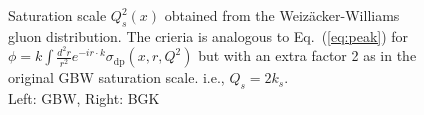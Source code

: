 \documentclass[11pt]{article}
\begin{document}
\begin{figure}[H]
\caption{Saturation scale $Q_s^2(x)$  obtained from the Weiz\"acker-Williams gluon distribution.
The crieria is analogous to Eq.~(\ref{eq:peak}) for $\phi=k\int \frac{d^2r}{r^2} e^{-i r\cdot k} \sigma_{\mathrm{dp}}(x,r,Q^2)$ but with an extra factor 2 as in the original GBW saturation scale.  i.e., $Q_s=2 k_s$.\\Left: GBW, Right: BGK }
\end{figure}
\end{document}
